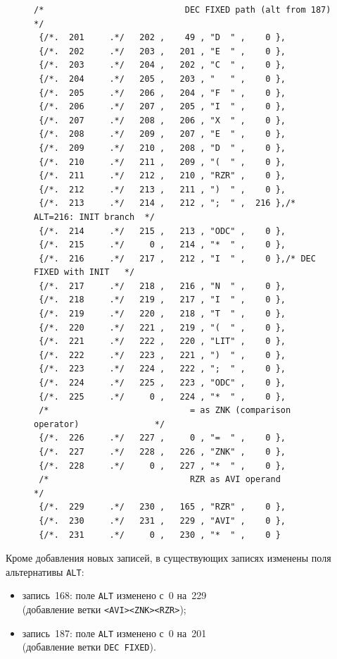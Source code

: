 \documentclass[a4paper,14pt]{extarticle}
\begin{document}
\begin{figure}[H]
\begin{lstlisting}[style=Cstyle,caption={Новые записи таблицы \texttt{SINT[]} (правила 201--231)},label=lst:sint_new]
 /*                            DEC FIXED path (alt from 187)               */
 {/*.  201     .*/   202 ,    49 , "D  " ,    0 },
 {/*.  202     .*/   203 ,   201 , "E  " ,    0 },
 {/*.  203     .*/   204 ,   202 , "C  " ,    0 },
 {/*.  204     .*/   205 ,   203 , "   " ,    0 },
 {/*.  205     .*/   206 ,   204 , "F  " ,    0 },
 {/*.  206     .*/   207 ,   205 , "I  " ,    0 },
 {/*.  207     .*/   208 ,   206 , "X  " ,    0 },
 {/*.  208     .*/   209 ,   207 , "E  " ,    0 },
 {/*.  209     .*/   210 ,   208 , "D  " ,    0 },
 {/*.  210     .*/   211 ,   209 , "(  " ,    0 },
 {/*.  211     .*/   212 ,   210 , "RZR" ,    0 },
 {/*.  212     .*/   213 ,   211 , ")  " ,    0 },
 {/*.  213     .*/   214 ,   212 , ";  " ,  216 },/* ALT=216: INIT branch  */
 {/*.  214     .*/   215 ,   213 , "ODC" ,    0 },
 {/*.  215     .*/     0 ,   214 , "*  " ,    0 },
 {/*.  216     .*/   217 ,   212 , "I  " ,    0 },/* DEC FIXED with INIT   */
 {/*.  217     .*/   218 ,   216 , "N  " ,    0 },
 {/*.  218     .*/   219 ,   217 , "I  " ,    0 },
 {/*.  219     .*/   220 ,   218 , "T  " ,    0 },
 {/*.  220     .*/   221 ,   219 , "(  " ,    0 },
 {/*.  221     .*/   222 ,   220 , "LIT" ,    0 },
 {/*.  222     .*/   223 ,   221 , ")  " ,    0 },
 {/*.  223     .*/   224 ,   222 , ";  " ,    0 },
 {/*.  224     .*/   225 ,   223 , "ODC" ,    0 },
 {/*.  225     .*/     0 ,   224 , "*  " ,    0 },
 /*                            = as ZNK (comparison operator)               */
 {/*.  226     .*/   227 ,     0 , "=  " ,    0 },
 {/*.  227     .*/   228 ,   226 , "ZNK" ,    0 },
 {/*.  228     .*/     0 ,   227 , "*  " ,    0 },
 /*                            RZR as AVI operand                           */
 {/*.  229     .*/   230 ,   165 , "RZR" ,    0 },
 {/*.  230     .*/   231 ,   229 , "AVI" ,    0 },
 {/*.  231     .*/     0 ,   230 , "*  " ,    0 }
\end{lstlisting}
\end{figure}

Кроме добавления новых записей, в существующих записях изменены поля альтернативы
\texttt{ALT}:
\begin{itemize}
  \item запись~168: поле \texttt{ALT} изменено с~0 на~229\\
        (добавление ветки \texttt{<AVI><ZNK><RZR>});
  \item запись~187: поле \texttt{ALT} изменено с~0 на~201\\
        (добавление ветки \texttt{DEC~FIXED}).
\end{itemize}
\end{document}
